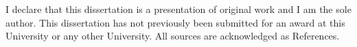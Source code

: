 I declare that this dissertation is a presentation of original work and I am the sole author. This dissertation has not previously been submitted for an award at this University or any other University. All sources are acknowledged as References.